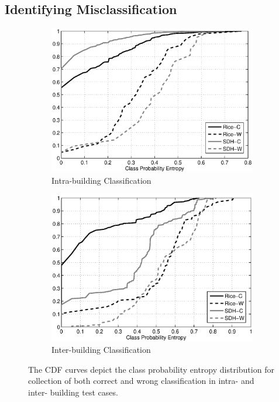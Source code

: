 \subsection{Identifying Misclassification}
\begin{figure}[ht]
\centering
	\begin{subfigure}{0.48\textwidth}
                \centering
		\includegraphics[width=\textwidth]{./fig/cdf_intra.eps}
                \caption{Intra-building Classification}
                \label{fig:cdf_intra}
	\end{subfigure}
	\begin{subfigure}{0.48\textwidth}
                \centering
		\includegraphics[width=\textwidth]{./fig/cdf_inter.eps}
                \caption{Inter-building Classification}
                \label{fig:cdf_inter}
	\end{subfigure}
\caption{The CDF curves depict the class probability entropy distribution for collection of both correct and wrong classification in intra- and inter- building test cases.}
\label{fig:cdf}
\end{figure}

